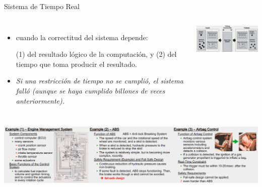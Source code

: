 \documentclass[8pt,aspectratio=169,compress]{beamer}
\begin{document}
\begin{frame}{Sistema de Tiempo Real}

   \begin{columns}[onlytextwidth,T]
     \column{\dimexpr\linewidth-70mm-5mm}

\begin{itemize}
  \item[REAL-TIME-SYSTEM] cuando la correctitud del sistema depende:

\bigskip
(1) del resultado lógico de la computación, y
\bigskip
(2) del tiempo que toma producir el resultado.

\bigskip
  \item[FALLO] \textit{Si una restricción de tiempo no se cumplió, el sistema falló (aunque se haya cumplido billones de veces anteriormente).}

\end{itemize}

      \column{70mm}
    \includegraphics[width=70mm]{images/rts.jpg}

    \end{columns}
\bigskip
    \includegraphics[width=140mm]{images/ejemplos.jpg}

\end{frame}
\end{document}
